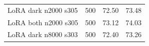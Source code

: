\begin{table}[htbp]
\begin{tabular}{lrrr}
LoRA dark n2000 s305 & %
500 & %
72.50 & %
73.48 \\ %

LoRA both n2000 s305 & %
500 & %
73.12 & %
74.03 \\ %

LoRA dark n8000 s303 & %
500 & %
72.40 & %
73.26 \\ %


\end{tabular}
\end{table}
